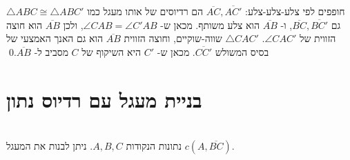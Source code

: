$\triangle ABC\cong\triangle ABC'$
חופפים לפי צלע-צלע-צלע:
$\overline{AC},\overline{AC'}$
הם רדיוסים של אותו מעגל כמו גם
$\overline{BC},\overline{BC'}$,
ו-%
$\overline{AB}$
הוא צלע משותף. מכאן ש-%
$\angle CAB = \angle C'AB$,
ולכן
$\overline{AB}$
הוא חוצה הזווית של
$\angle CAC'$.
$\triangle CAC'$
שווה-שוקיים, וחוצה הזווית
$\overline{AB}$
הוא גם האנך האמצעי של בסיס המשולש
$\overline{CC'}$.
מכאן ש-%
$C'$
היא השיקוף של
$C$
מסביב ל-%
$\overline{AB}$.\qed


\section{בניית מעגל עם רדיוס נתון}

\begin{theorem}\label{thm.radius}\mbox{}\\
נתונות הנקודות
$A,B,C$.
ניתן לבנות את המעגל
$c(A,\overline{BC})$.
%
\end{theorem}



